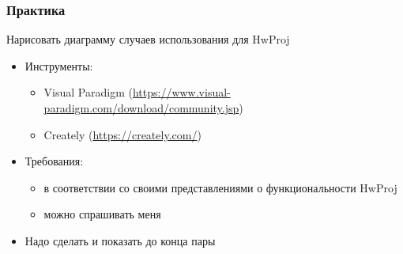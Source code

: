 \documentclass[xetex,mathserif,serif]{beamer}
\begin{document}
	\begin{frame}
		\frametitle{Практика}
		Нарисовать диаграмму случаев использования для HwProj
		\begin{itemize}
			\item Инструменты:
			\begin{itemize}
				\item Visual Paradigm (\url{https://www.visual-paradigm.com/download/community.jsp})
				\item Creately (\url{https://creately.com/})
			\end{itemize}
			\item Требования:
			\begin{itemize}
				\item в соответствии со своими представлениями о функциональности HwProj
				\item можно спрашивать меня
			\end{itemize}
			\item Надо сделать и показать до конца пары
		\end{itemize}
	\end{frame}
\end{document}
